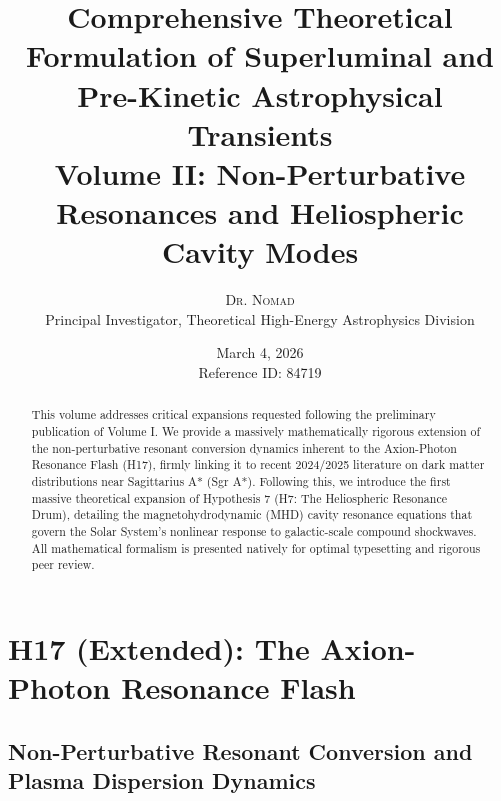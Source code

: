 \documentclass[12pt,a4paper]{article}
\title{\textbf{Comprehensive Theoretical Formulation of Superluminal and Pre-Kinetic Astrophysical Transients}\\
\Large Volume II: Non-Perturbative Resonances and Heliospheric Cavity Modes}
\author{\textsc{Dr. Nomad}\\
Principal Investigator, Theoretical High-Energy Astrophysics Division}
\date{March 4, 2026 \\ Reference ID: 84719}
\begin{document}
\maketitle

\begin{abstract}
This volume addresses critical expansions requested following the preliminary publication of Volume I. We provide a massively mathematically rigorous extension of the non-perturbative resonant conversion dynamics inherent to the Axion-Photon Resonance Flash (H17), firmly linking it to recent 2024/2025 literature on dark matter distributions near Sagittarius A* (Sgr A*). Following this, we introduce the first massive theoretical expansion of Hypothesis 7 (H7: The Heliospheric Resonance Drum), detailing the magnetohydrodynamic (MHD) cavity resonance equations that govern the Solar System's nonlinear response to galactic-scale compound shockwaves. All mathematical formalism is presented natively for optimal typesetting and rigorous peer review.
\end{abstract}

\tableofcontents
\newpage

\section{H17 (Extended): The Axion-Photon Resonance Flash}

\subsection{Non-Perturbative Resonant Conversion and Plasma Dispersion Dynamics}
\end{document}
